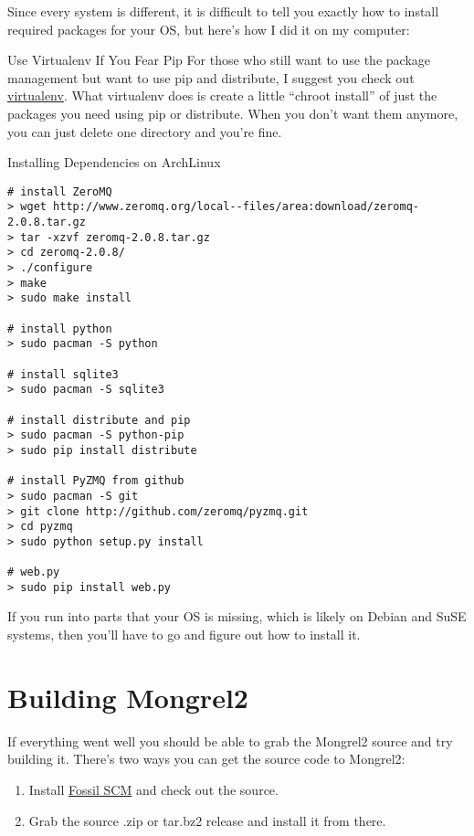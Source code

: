 Since every system is different, it is difficult to tell you exactly how to
install required packages for your OS, but here's how I did it on my computer:

\begin{aside}{Use Virtualenv If You Fear Pip}
For those who still want to use the package management but want to use pip and
distribute, I suggest you check out \href{http://pypi.python.org/pypi/virtualenv}{virtualenv}.
What virtualenv does is create a little ``chroot install'' of just the packages
you need using pip or distribute.  When you don't want them anymore, you can just
delete one directory and you're fine.
\end{aside}


\begin{code}{Installing Dependencies on ArchLinux}
\begin{lstlisting}
# install ZeroMQ
> wget http://www.zeromq.org/local--files/area:download/zeromq-2.0.8.tar.gz
> tar -xzvf zeromq-2.0.8.tar.gz
> cd zeromq-2.0.8/
> ./configure
> make
> sudo make install

# install python
> sudo pacman -S python

# install sqlite3
> sudo pacman -S sqlite3

# install distribute and pip
> sudo pacman -S python-pip
> sudo pip install distribute

# install PyZMQ from github
> sudo pacman -S git
> git clone http://github.com/zeromq/pyzmq.git
> cd pyzmq
> sudo python setup.py install

# web.py
> sudo pip install web.py
\end{lstlisting}
\end{code}

If you run into parts that your OS is missing, which is likely on
Debian and SuSE systems, then you'll have to go and figure out
how to install it.


\section{Building Mongrel2}

If everything went well you should be able to grab the Mongrel2 source
and try building it.  There's two ways you can get the source code to
Mongrel2:

\begin{enumerate}
\item Install \href{http://fossil-scm.org}{Fossil SCM} and check out the source.
\item Grab the source .zip or tar.bz2 release and install it from there.
\end{enumerate}

